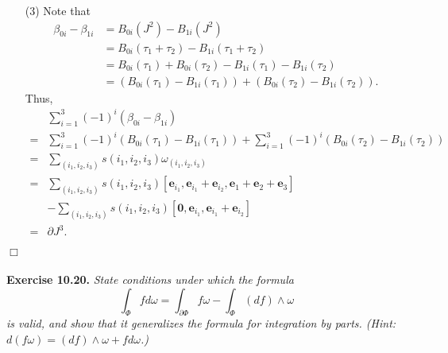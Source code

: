 \documentclass{article}
\begin{document}
\begin{enumerate}
\item[(3)]
  Note that
  \begin{align*}
    \beta_{0i}-\beta_{1i}
    &= B_{0i}(J^2) - B_{1i}(J^2) \\
    &= B_{0i}(\tau_1+\tau_2) - B_{1i}(\tau_1+\tau_2) \\
    &= B_{0i}(\tau_1) + B_{0i}(\tau_2) - B_{1i}(\tau_1) - B_{1i}(\tau_2) \\
    &= (B_{0i}(\tau_1) - B_{1i}(\tau_1)) + (B_{0i}(\tau_2) - B_{1i}(\tau_2)).
  \end{align*}
  Thus,
  \begin{align*}
    &\sum_{i=1}^3 (-1)^{i} (\beta_{0i}-\beta_{1i}) \\
    =& \sum_{i=1}^3 (-1)^{i} (B_{0i}(\tau_1) - B_{1i}(\tau_1))
      + \sum_{i=1}^3 (-1)^{i} (B_{0i}(\tau_2) - B_{1i}(\tau_2)) \\
    =& \sum_{(i_1,i_2,i_3)} s(i_1,i_2,i_3) \omega_{(i_1,i_2,i_3)} \\
    =& \sum_{(i_1,i_2,i_3)} s(i_1, i_2, i_3)
      [
        \mathbf{e}_{i_1},
        \mathbf{e}_{i_1}+\mathbf{e}_{i_2},
        \mathbf{e}_{1}+\mathbf{e}_{2}+\mathbf{e}_{3}
      ] \\
      &- \sum_{(i_1,i_2,i_3)} s(i_1, i_2, i_3) [
        \mathbf{0},
        \mathbf{e}_{i_1},
        \mathbf{e}_{i_1}+\mathbf{e}_{i_2}
      ] \\
    =& \partial J^3.
  \end{align*}
\end{enumerate}
$\Box$ \\\\






\textbf{Exercise 10.20.}
\emph{State conditions under which the formula
\[
  \int_{\Phi} fd\omega
  = \int_{\partial\Phi} f\omega - \int_{\Phi}(df) \wedge \omega
\]
is valid, and show that it generalizes the formula for integration by parts.
(Hint: $d(f\omega) = (df) \wedge \omega + f d\omega$.)} \\
\end{document}
